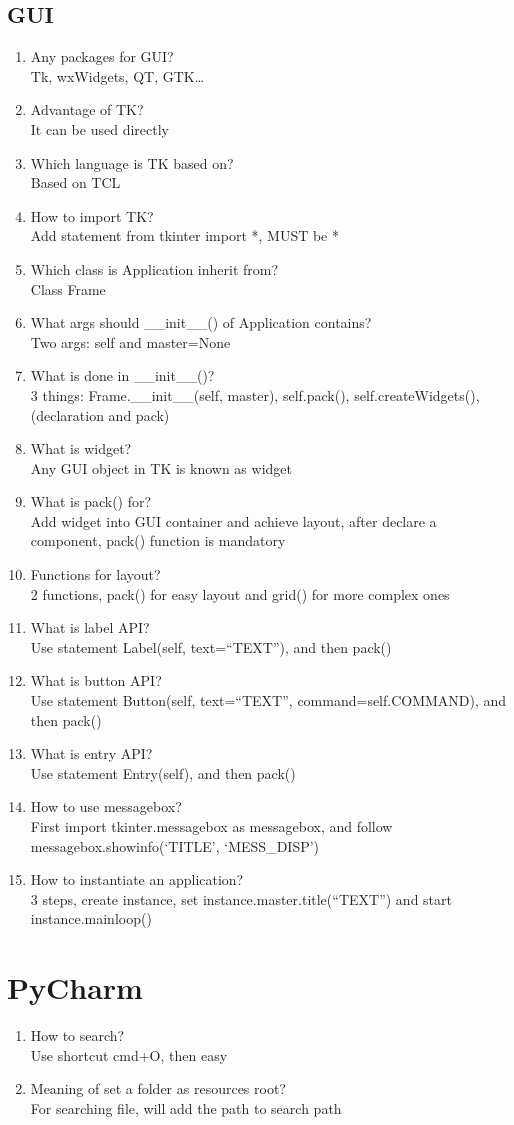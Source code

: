 \documentclass[10pt,a4paper,oneside]{article}
\begin{document}
\subsection{GUI}
\begin{enumerate}[1.]
\item Any packages for GUI?\\
Tk, wxWidgets, QT, GTK\dots
\item Advantage of TK?\\
It can be used directly
\item Which language is TK based on?\\
Based on TCL
\item How to import TK?\\
Add statement from tkinter import *, MUST be *
\item Which class is Application inherit from?\\
Class Frame
\item What args should \_\_init\_\_() of Application contains?\\
Two args: self and master=None
\item What is done in \_\_init\_\_()?\\
3 things: Frame.\_\_init\_\_(self, master), self.pack(), self.createWidgets(), (declaration and pack)
\item What is widget?\\
Any GUI object in TK is known as widget
\item What is pack() for?\\
Add widget into GUI container and achieve layout, after declare a component, pack() function is mandatory
\item Functions for layout?\\
2 functions, pack() for easy layout and grid() for more complex ones
\item What is label API?\\
Use statement Label(self, text=``TEXT''), and then pack()
\item What is button API?\\
Use statement Button(self, text=``TEXT'', command=self.COMMAND), and then pack()
\item What is entry API?\\
Use statement Entry(self), and then pack()
\item How to use messagebox?\\
First import tkinter.messagebox as messagebox, and follow messagebox.showinfo(`TITLE', `MESS\_DISP')
\item How to instantiate an application?\\
3 steps, create instance, set instance.master.title(``TEXT'') and start instance.mainloop()
\end{enumerate}
\section{PyCharm}
\begin{enumerate}[1.]
\item How to search?\\
Use shortcut cmd+O, then easy
\item Meaning of set a folder as resources root?\\
For searching file, will add the path to search path
\end{enumerate}
\end{document}
